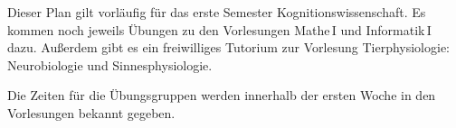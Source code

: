 Dieser Plan gilt vorläufig für das erste Semester Kognitionswissenschaft. 
Es kommen noch jeweils Übungen zu den Vorlesungen Mathe\,I und Informatik\,I %
dazu.
Außerdem gibt es ein freiwilliges Tutorium zur Vorlesung Tierphysiologie: Neurobiologie und Sinnesphysiologie. %

Die Zeiten für die Übungsgruppen werden innerhalb der ersten Woche in den Vorlesungen bekannt gegeben.
\\ \\
